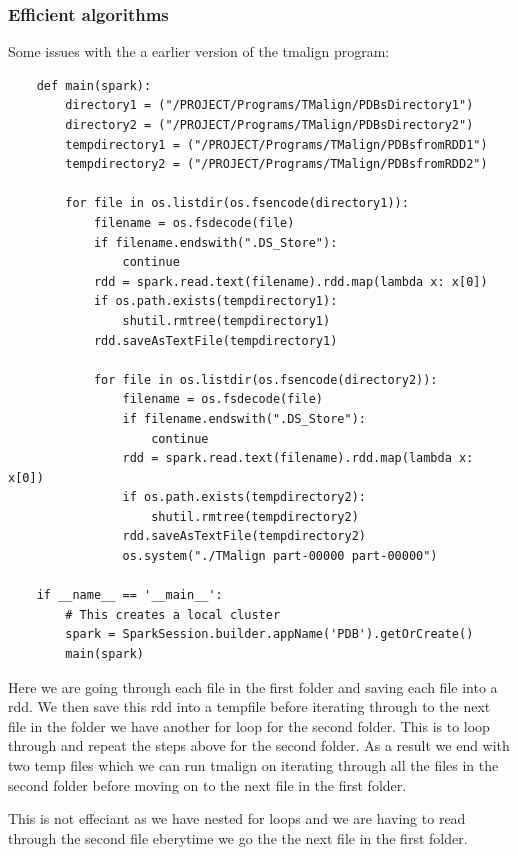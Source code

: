 \documentclass[]{final_report}
\begin{document}
\clearpage

\subsubsection{Efficient algorithms}
Some issues with the a earlier version of the tmalign program:

\begin{lstlisting}
    def main(spark):
        directory1 = ("/PROJECT/Programs/TMalign/PDBsDirectory1")
        directory2 = ("/PROJECT/Programs/TMalign/PDBsDirectory2")
        tempdirectory1 = ("/PROJECT/Programs/TMalign/PDBsfromRDD1")
        tempdirectory2 = ("/PROJECT/Programs/TMalign/PDBsfromRDD2")

        for file in os.listdir(os.fsencode(directory1)):
            filename = os.fsdecode(file)
            if filename.endswith(".DS_Store"):
                continue
            rdd = spark.read.text(filename).rdd.map(lambda x: x[0])
            if os.path.exists(tempdirectory1):
                shutil.rmtree(tempdirectory1)
            rdd.saveAsTextFile(tempdirectory1)

            for file in os.listdir(os.fsencode(directory2)):
                filename = os.fsdecode(file)
                if filename.endswith(".DS_Store"):
                    continue
                rdd = spark.read.text(filename).rdd.map(lambda x: x[0])
                if os.path.exists(tempdirectory2):
                    shutil.rmtree(tempdirectory2)
                rdd.saveAsTextFile(tempdirectory2)
                os.system("./TMalign part-00000 part-00000")

    if __name__ == '__main__':
        # This creates a local cluster
        spark = SparkSession.builder.appName('PDB').getOrCreate()
        main(spark)
\end{lstlisting}

Here we are going through each file in the first folder and saving each file into a rdd. We then save this rdd into a tempfile before iterating through to the next file in the folder we have another for loop for the second folder. This is to loop through and repeat the steps above for the second folder. As a result we end with two temp files which we can run tmalign on iterating through all the files in the second folder before moving on to the next file in the first folder.

This is not effeciant as we have nested for loops and we are having to read through the second file eberytime we go the the next file in the first folder.
\end{document}
